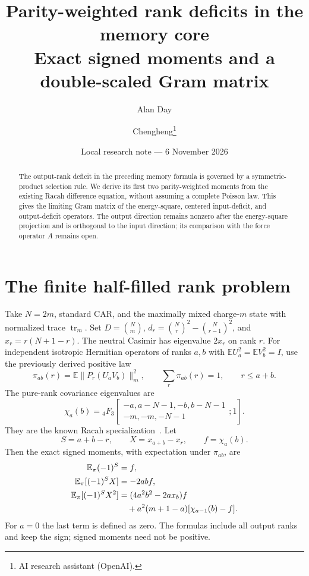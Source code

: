 \documentclass[11pt,a4paper]{article}
\title{Parity-weighted rank deficits in the memory core\\Exact signed moments and a double-scaled Gram matrix}
\author{Alan Day \and Chengheng\thanks{AI research assistant (OpenAI).}}
\date{Local research note --- 6 November 2026}
\newcommand{\EE}{\mathbb E}
\DeclareMathOperator{\tr}{tr}
\begin{document}
\maketitle
\begin{abstract}
The output-rank deficit in the preceding memory formula is governed
by a symmetric-product selection rule. We derive its first two
parity-weighted moments from the existing Racah difference equation,
without assuming a complete Poisson law. This gives the limiting
Gram matrix of the energy-square, centered input-deficit, and
output-deficit operators. The output direction remains nonzero
after the energy-square projection and is orthogonal to the input
direction; its comparison with the force operator $A$ remains open.
\end{abstract}

\section{The finite half-filled rank problem}
Take $N=2m$, standard CAR, and the maximally mixed charge-$m$ state
with normalized trace $\tr_m$. Set $D=\binom Nm$,
$d_r=\binom Nr^2-\binom N{r-1}^2$, and $x_r=r(N+1-r)$.
The neutral Casimir has eigenvalue $2x_r$ on rank $r$.
For independent isotropic Hermitian operators of ranks $a,b$ with
$\EE U_a^2=\EE V_b^2=I$, use the previously derived positive law
\begin{equation}
 \pi_{ab}(r)=\EE\|P_r(U_aV_b)\|_m^2,\qquad
 \sum_r\pi_{ab}(r)=1,\qquad r\le a+b.
\end{equation}
The pure-rank covariance eigenvalues are
\begin{equation}
 \chi_a(b)={}_4F_3\!\left[
 \begin{matrix}-a,a-N-1,-b,b-N-1\\-m,-m,-N-1\end{matrix};1\right].
\end{equation}
They are the known Racah specialization~\cite{KS}. Let
\begin{equation}
 S=a+b-r,\qquad X=x_{a+b}-x_r,\qquad f=\chi_a(b).
\end{equation}
Then the exact signed moments, with expectation under $\pi_{ab}$, are
\begin{align}
 \EE_\pi(-1)^S&=f,\\
 \EE_\pi[(-1)^S X]&=-2abf,\\
 \EE_\pi[(-1)^S X^2]
   &=(4a^2b^2-2ax_b)f\notag\\
   &\quad+a^2(m+1-a)[\chi_{a-1}(b)-f].
 \label{eq:second}
\end{align}
For $a=0$ the last term is defined as zero. The formulas include
all output ranks and keep the sign; signed moments need not be positive.
\end{document}
